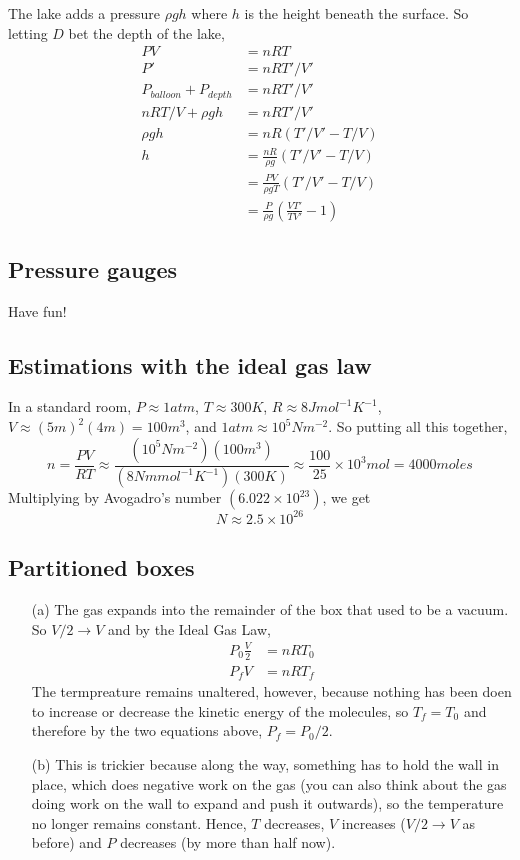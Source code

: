 \documentclass{article}
\begin{document}
The lake adds a pressure $\rho gh$ where $h$ is the height beneath the surface. So letting $D$ bet the depth of the lake,
\begin{align*}
PV &= nRT \\
P' &= nRT'/V' \\
P_{balloon} + P_{depth} &= nRT'/V' \\
nRT/V + \rho gh &= nRT'/V' \\
\rho gh &= nR(T'/V'-T/V) \\
h &= \frac{nR}{\rho g}(T'/V'-T/V) \\
&= \frac{PV}{\rho gT}(T'/V'-T/V) \\
&= \frac{P}{\rho g}\left(\frac{VT'}{TV'}-1\right)
\end{align*}

\subsection{Pressure gauges}

Have fun!

\subsection{Estimations with the ideal gas law}

In a standard room, $P\approx 1 atm$, $T \approx 300 K$, $R\approx 8 J mol^{-1} K^{-1}$, $V\approx (5 m)^2(4 m) = 100 m^3$, and $1 atm\approx 10^5 N m^{-2}$. So putting all this together,
\begin{equation}
n = \frac{PV}{RT} \approx \frac{(10^5 N m^{-2})(100 m^3)}{(8 N m mol^{-1} K^{-1})(300 K)} \approx \frac{100}{25}\times 10^3 mol = 4000 moles
\end{equation}
Multiplying by Avogadro's number $\left(6.022\times10^{23}\right)$, we get
\begin{equation}
N\approx 2.5\times10^{26}
\end{equation}

\subsection{Partitioned boxes}

\begin{itemize}
	\item[(a)] The gas expands into the remainder of the box that used to be a vacuum. So $V/2\rightarrow V$ and by the Ideal Gas Law,
	\begin{align*}
	P_0\frac{V}{2}&=nRT_0 \\
	P_fV &= nRT_f
	\end{align*}
	The termpreature remains unaltered, however, because nothing has been doen to increase or decrease the kinetic energy of the molecules, so $T_f=T_0$ and therefore by the two equations above, $P_f=P_0/2$.
	\item[(b)] This is trickier because along the way, something has to hold the wall in place, which does negative work on the gas (you can also think about the gas doing work on the wall to expand and push it outwards), so the temperature no longer remains constant. Hence, $T$ decreases, $V$ increases ($V/2\rightarrow V$ as before) and $P$ decreases (by more than half now).
\end{itemize}
\end{document}
